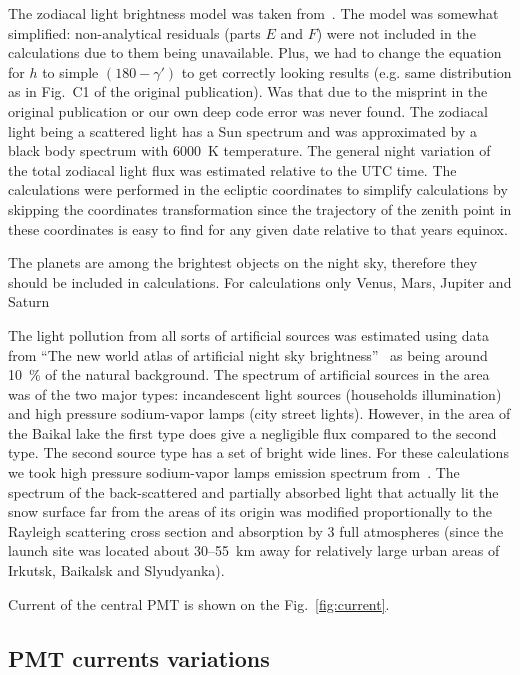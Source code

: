 \documentclass[final,5p,times,twocolumn]{elsarticle}
\begin{document}
The zodiacal light brightness model was taken from~\cite{BUFFINGTON201688}. The model was somewhat simplified: non-analytical residuals (parts $E$ and $F$) were not included in the calculations due to them being unavailable. Plus, we had to change the equation for $h$ to simple $(180-\gamma')$ to get correctly looking results (e.g. same distribution as in Fig.~C1 of the original publication). Was that due to the misprint in the original publication or our own deep code error was never found. The zodiacal light being a scattered light has a Sun spectrum and was approximated by a black body spectrum with 6000~K temperature. The general night variation of the total zodiacal light flux was estimated relative to the UTC time. The calculations were performed in the ecliptic coordinates  to simplify calculations by skipping the coordinates transformation since the trajectory of the zenith point in these coordinates is easy to find for any given date relative to that years equinox. 

The planets are among the brightest objects on the night sky, therefore they should be included in calculations. For calculations only Venus, Mars, Jupiter and Saturn

The light pollution from all sorts of artificial sources was estimated using data from ``The new world atlas of artificial night sky brightness''~\cite{Falchie1600377} as being around 10~\% of the natural background. The spectrum of artificial sources in the area was of the two major types: incandescent light sources (households illumination) and high pressure sodium-vapor lamps (city street lights). However, in the area of the Baikal lake the first type does give a negligible flux compared to the second type. The second source type has a set of bright wide lines. For these calculations we took high pressure sodium-vapor lamps emission spectrum from~\cite{Elvige2010}. The spectrum of the back-scattered and partially absorbed light that actually lit the snow surface far from the areas of its origin was modified proportionally to the Rayleigh scattering cross section and absorption by 3 full atmospheres (since the launch site was located about 30--55~km away for relatively large urban areas of Irkutsk, Baikalsk and Slyudyanka).

Current of the central PMT is shown on the Fig.~\ref{fig:current}. 



\subsection{PMT currents variations}
\end{document}
